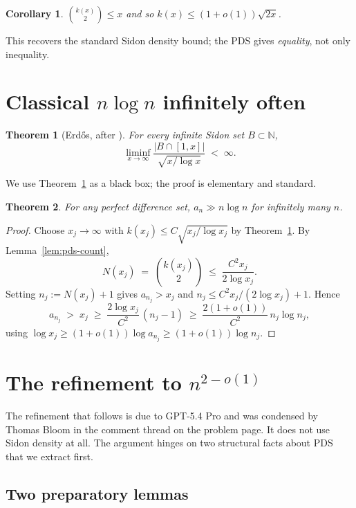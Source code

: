 \documentclass[11pt]{article}
\newtheorem{theorem}{Theorem}
\newtheorem{corollary}{Corollary}
\begin{document}
\begin{corollary}\label{cor:trivial}
$\binom{k(x)}{2} \leq x$ and so $k(x) \leq (1 + o(1)) \sqrt{2x}$.
\end{corollary}

\noindent
This recovers the standard Sidon density bound; the PDS gives \emph{equality},
not only inequality.

\section{Classical $n \log n$ infinitely often}\label{sec:nlogn}

\begin{theorem}[Erd\H{o}s, after \cite{HaRo66}]\label{thm:sidon-io}
For every infinite Sidon set $B \subset \mathbb{N}$,
\[
   \liminf_{x \to \infty} \frac{|B \cap [1,x]|}{\sqrt{x/\log x}}
   \;<\; \infty.
\]
\end{theorem}

\noindent We use Theorem~\ref{thm:sidon-io} as a black box; the proof is
elementary and standard.

\begin{theorem}\label{thm:nlogn}
For any perfect difference set, $a_n \gg n \log n$ for infinitely many $n$.
\end{theorem}

\begin{proof}
Choose $x_j \to \infty$ with $k(x_j) \leq C \sqrt{x_j / \log x_j}$
by Theorem~\ref{thm:sidon-io}. By Lemma~\ref{lem:pds-count},
\[
   N(x_j) \;=\; \binom{k(x_j)}{2}
   \;\leq\; \frac{C^2 x_j}{2 \log x_j}.
\]
Setting $n_j := N(x_j) + 1$ gives $a_{n_j} > x_j$ and
$n_j \leq C^2 x_j / (2 \log x_j) + 1$. Hence
\[
   a_{n_j} \;>\; x_j
   \;\geq\; \frac{2 \log x_j}{C^2}\,(n_j - 1)
   \;\geq\; \frac{2 (1+o(1))}{C^2}\, n_j \log n_j,
\]
using $\log x_j \geq (1+o(1)) \log a_{n_j} \geq (1+o(1)) \log n_j$.
\end{proof}

\section{The refinement to $n^{2-o(1)}$}\label{sec:n2}

The refinement that follows is due to GPT-5.4 Pro and was condensed by
Thomas Bloom in the comment thread on the problem page. It does not use
Sidon density at all. The argument hinges on two structural facts about
PDS that we extract first.

\subsection{Two preparatory lemmas}
\end{document}
